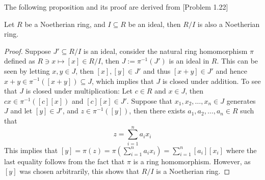 The following proposition and its proof are derived from \cite{Fulton}[Problem 1.22]
\begin{proposition}\label{prop:cosets_are_noetherian}
  Let $R$ be a Noetherian ring, and $I \subseteq R$ be an ideal, then $R / I$ is also a Noetherian ring.
\end{proposition}
%
%

\begin{proof}
  Suppose $J' \subseteq R / I$ is an ideal, consider the natural ring homomorphism $\pi$ defined as $R \ni x \mapsto [x] \in R / I$, then $J := \pi^{-1}(J')$ is an ideal in $R$. This can be seen by letting $x, y \in J$, then $[x], [y] \in J'$ and thus $[x + y] \in J'$ and hence $x + y \in \pi^{-1}([x + y]) \subseteq J$, which implies that $J$ is closed under addition. To see that $J$ is closed under multiplication: Let $c \in R$ and $x \in J$, then $cx \in \pi^{-1}([c][x])$ and $[c][x] \in J'$. Suppose that $x_1, x_2, \ldots, x_{n} \in J$ generates $J$ and let $[y] \in J'$, and $z \in \pi^{-1}([y])$, then there exists $a_1, a_2, \ldots, a_{n} \in R$ such that
  \begin{equation*}
    z  = \sum_{i = 1}^{n} a_{i} x_{i}
  \end{equation*}
  This implies that $[y] = \pi(z) = \pi(\sum_{i = 1}^{n} a_{i} x_{i}) = \sum_{i = 1}^{n} [a_{i}][x_{i}]$ where the last equality follows from the fact that $\pi$ is a ring homomorphism. However, as $[y]$ was chosen arbitrarily, this shows that $R / I$ is a Noetherian ring.
\end{proof}
